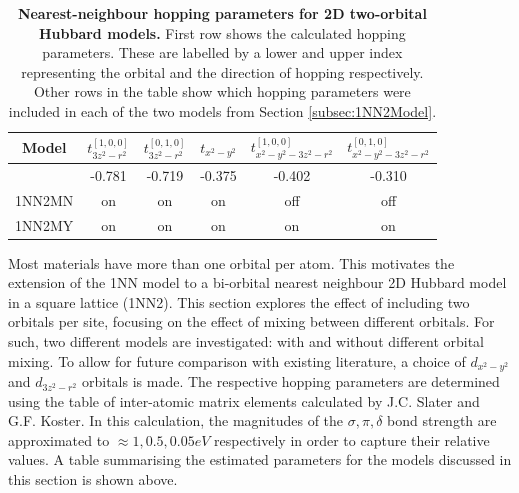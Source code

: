 \documentclass[11pt]{article}
\begin{document}
\begin{table}[h]
    \centering
    \begin{tabular}{|c|c|c|c|c|c|}
        \hline
       Model &$t^{[1,0,0]}_{3z^2-r^2}$  &$t^{[0,1,0]}_{3z^2-r^2}$  &  $t_{x^2 - y^2}$ &  $t^{[1,0,0]}_{x^2 - y^2 -3z^2-r^2} $ & $t^{[0,1,0]}_{x^2 - y^2 -3z^2-r^2} $ \\
        \hline
        & -0.781 & -0.719  &  -0.375 & -0.402 & -0.310\\
        \hline
        1NN2MN & on &  on  & on  & off & off  \\
        \hline
        1NN2MY & on &  on  & on  & on & on \\
          
        \hline
    \end{tabular}
    \caption{\textbf{Nearest-neighbour hopping parameters for 2D  two-orbital Hubbard models.} First row shows the calculated hopping parameters.
    These are labelled by a lower and upper index representing the orbital and the direction of hopping respectively.
    Other rows in the table show which hopping parameters were included in each of the two models from Section \ref{subsec:1NN2Model}.}
    \label{tab:2D2orbparams }
\end{table}


\noindent Most materials have more than one orbital per atom. This motivates the extension of the 
1NN model to a  bi-orbital nearest neighbour 2D Hubbard model in a square lattice (1NN2). This section explores the effect
of including two orbitals per site, focusing on the effect of mixing between different orbitals. For such, two different models are 
investigated: with and without different orbital mixing. To allow for future comparison with
existing literature\cite{sakakibara2024possible}, a choice of $d_{x^2-y^2}$ and $d_{3z^2 -r^2}$ orbitals is made. 
The respective hopping parameters are determined using the  table of inter-atomic matrix elements calculated by J.C. Slater and G.F. Koster\cite{slater1954simplified}. 
In this calculation, the magnitudes of the $\sigma,  \pi, \delta$ bond strength  are approximated to  $\approx  1, 0.5, 0.05 eV$ respectively in order to capture their relative values\cite{blanksby2003bond, mcgrady2015introduction, krapp2008strength}.
A table summarising the estimated parameters for the models discussed in this section is shown above.\par

\medskip
\end{document}
